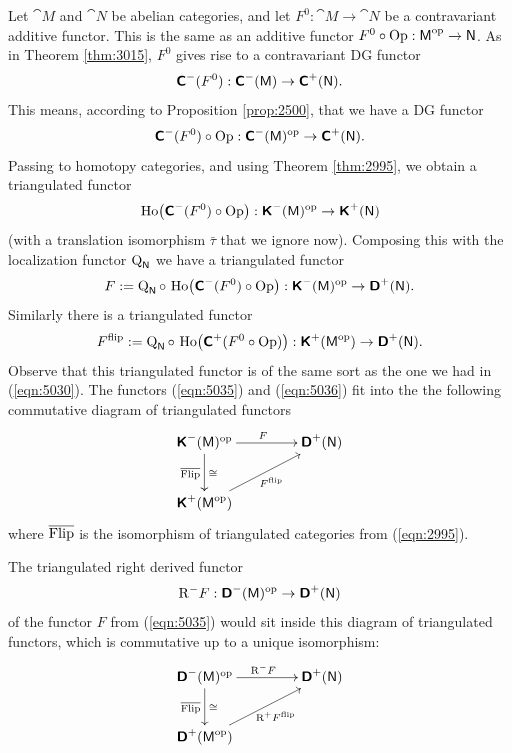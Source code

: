\begin{exa} \label{exa:3055}
Let $\cat{M}$ and $\cat{N}$ be abelian categories, and let 
$F^0 : \cat{M} \to \cat{N}$
be a contravariant additive functor. This is the same as an additive functor
$F^0 \circ \operatorname{Op} : \operatorname{\mathsf{M}}^{\mathrm{op}} \to \operatorname{\mathsf{N}}$.
As in Theorem \ref{thm:3015}, $F^0$ gives 
rise to a contravariant DG functor 
\[ \boldsymbol{\mathsf{C}}^-(F^0) : \boldsymbol{\mathsf{C}}^-(\operatorname{\mathsf{M}}) \to \boldsymbol{\mathsf{C}}^+(\operatorname{\mathsf{N}}) . \]
This means, according to Proposition \ref{prop:2500}, that we have a  DG 
functor 
\[ \boldsymbol{\mathsf{C}}^-(F^0) \circ \operatorname{Op} : \boldsymbol{\mathsf{C}}^-(\operatorname{\mathsf{M}})^{\mathrm{op}} \to 
\boldsymbol{\mathsf{C}}^+(\operatorname{\mathsf{N}}) . \]
Passing to homotopy categories, and using Theorem \ref{thm:2995}, we obtain a 
triangulated functor 
\[ \operatorname{Ho} \bigl( \boldsymbol{\mathsf{C}}^-(F^0) \circ \operatorname{Op} \bigr) :
\boldsymbol{\mathsf{K}}^-(\operatorname{\mathsf{M}})^{\mathrm{op}} \to \boldsymbol{\mathsf{K}}^+(\operatorname{\mathsf{N}}) \]
(with a translation isomorphism $\bar{\tau}$ that we ignore 
now). Composing this with the localization functor
$\operatorname{Q}_{\operatorname{\mathsf{N}}}$ we have a triangulated functor 
\begin{equation} \label{eqn:5035}
F := \operatorname{Q}_{\operatorname{\mathsf{N}}} \circ \, 
\operatorname{Ho} \bigl( \boldsymbol{\mathsf{C}}^-(F^0) \circ \operatorname{Op} \bigr) : 
\boldsymbol{\mathsf{K}}^-(\operatorname{\mathsf{M}})^{\mathrm{op}} \to 
\boldsymbol{\mathsf{D}}^+(\operatorname{\mathsf{N}}) .
\end{equation}
Similarly there is a triangulated functor 
\begin{equation} \label{eqn:5036}
F^{\mathrm{flip}} := \operatorname{Q}_{\operatorname{\mathsf{N}}} \circ \, 
\operatorname{Ho} \bigl( \boldsymbol{\mathsf{C}}^+(F^0 \circ \operatorname{Op}) \bigr) :
\boldsymbol{\mathsf{K}}^+(\operatorname{\mathsf{M}}^{\mathrm{op}}) \to \boldsymbol{\mathsf{D}}^+(\operatorname{\mathsf{N}}) .
\end{equation}
Observe that this triangulated functor is of the same sort as the one we had in 
(\ref{eqn:5030}). The functors (\ref{eqn:5035}) and (\ref{eqn:5036}) 
fit into the the following commutative diagram of triangulated functors 
\[ \UseTips \xymatrix @C=10ex @R=6ex {
\dcat{K}^-(\cat{M})^{\mrm{op}}
\ar[r]^{F}
\ar[d]_{\ol{\opn{Flip}}}^{\cong}
&
\dcat{D}^+(\cat{N})
\\
\dcat{K}^+(\cat{M}^{\mrm{op}}) 
\ar[ur]_{F^{\mrm{flip}}}
} \]
where $\overline{\operatorname{Flip}}$ is the isomorphism of triangulated categories from 
(\ref{eqn:2995}). 

The triangulated right derived functor 
\begin{equation} \label{eqn:5037}
\mathrm{R}^- F : \boldsymbol{\mathsf{D}}^-(\operatorname{\mathsf{M}})^{\mathrm{op}} \to \boldsymbol{\mathsf{D}}^+(\operatorname{\mathsf{N}})
\end{equation}
of the functor $F$ from (\ref{eqn:5035}) would sit inside this diagram of 
triangulated functors, which is 
commutative up to a unique isomorphism: 
\[ \UseTips \xymatrix @C=10ex @R=6ex {
\dcat{D}^-(\cat{M})^{\mrm{op}}
\ar[r]^{\mrm{R}^-F}
\ar[d]_{\ol{\opn{Flip}}}^{\cong}
&
\dcat{D}^+(\cat{N})
\\
\dcat{D}^+(\cat{M}^{\mrm{op}}) 
\ar[ur]_{\mrm{R}^+ F^{\mrm{flip}}}
} \]


\end{exa}
